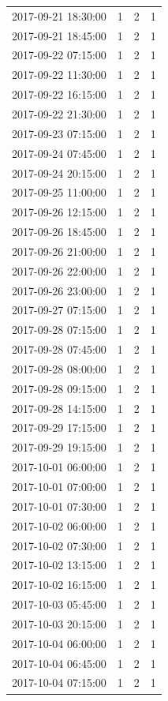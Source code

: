\begin{tabular}{lrrr}
2017-09-21 18:30:00 & 1 & 2 & 1 \\
2017-09-21 18:45:00 & 1 & 2 & 1 \\
2017-09-22 07:15:00 & 1 & 2 & 1 \\
2017-09-22 11:30:00 & 1 & 2 & 1 \\
2017-09-22 16:15:00 & 1 & 2 & 1 \\
2017-09-22 21:30:00 & 1 & 2 & 1 \\
2017-09-23 07:15:00 & 1 & 2 & 1 \\
2017-09-24 07:45:00 & 1 & 2 & 1 \\
2017-09-24 20:15:00 & 1 & 2 & 1 \\
2017-09-25 11:00:00 & 1 & 2 & 1 \\
2017-09-26 12:15:00 & 1 & 2 & 1 \\
2017-09-26 18:45:00 & 1 & 2 & 1 \\
2017-09-26 21:00:00 & 1 & 2 & 1 \\
2017-09-26 22:00:00 & 1 & 2 & 1 \\
2017-09-26 23:00:00 & 1 & 2 & 1 \\
2017-09-27 07:15:00 & 1 & 2 & 1 \\
2017-09-28 07:15:00 & 1 & 2 & 1 \\
2017-09-28 07:45:00 & 1 & 2 & 1 \\
2017-09-28 08:00:00 & 1 & 2 & 1 \\
2017-09-28 09:15:00 & 1 & 2 & 1 \\
2017-09-28 14:15:00 & 1 & 2 & 1 \\
2017-09-29 17:15:00 & 1 & 2 & 1 \\
2017-09-29 19:15:00 & 1 & 2 & 1 \\
2017-10-01 06:00:00 & 1 & 2 & 1 \\
2017-10-01 07:00:00 & 1 & 2 & 1 \\
2017-10-01 07:30:00 & 1 & 2 & 1 \\
2017-10-02 06:00:00 & 1 & 2 & 1 \\
2017-10-02 07:30:00 & 1 & 2 & 1 \\
2017-10-02 13:15:00 & 1 & 2 & 1 \\
2017-10-02 16:15:00 & 1 & 2 & 1 \\
2017-10-03 05:45:00 & 1 & 2 & 1 \\
2017-10-03 20:15:00 & 1 & 2 & 1 \\
2017-10-04 06:00:00 & 1 & 2 & 1 \\
2017-10-04 06:45:00 & 1 & 2 & 1 \\
2017-10-04 07:15:00 & 1 & 2 & 1 \\

\end{tabular}
